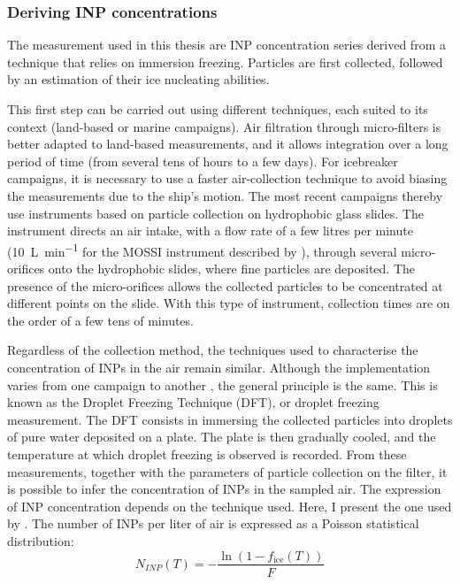        \subsubsection{Deriving INP concentrations}
        The measurement used in this thesis are INP concentration series derived from a technique that relies on immersion freezing. Particles are first collected, followed by an estimation of their ice nucleating abilities.

        This first step can be carried out using different techniques, each suited to its context (land-based or marine campaigns). Air filtration through micro-filters is better adapted to land-based measurements, and it allows integration over a long period of time (from several tens of hours to a few days). For icebreaker campaigns, it is necessary to use a faster air-collection technique to avoid biasing the measurements due to the ship’s motion. The most recent campaigns thereby use instruments based on particle collection on hydrophobic glass slides. The instrument directs an air intake, with a flow rate of a few litres per minute (\SI{10}{\liter\per\minute} for the MOSSI instrument described by \citet{irish_ice_2019}), through several micro-orifices onto the hydrophobic slides, where fine particles are deposited. The presence of the micro-orifices allows the collected particles to be concentrated at different points on the slide. With this type of instrument, collection times are on the order of a few tens of minutes.

    Regardless of the collection method, the techniques used to characterise the concentration of INPs in the air remain similar. Although the implementation varies from one campaign to another \citep{conen_atmospheric_2012, mason_micro-orifice_2015}, the general principle is the same. This is known as the Droplet Freezing Technique (DFT), or droplet freezing measurement. The DFT consists in immersing the collected particles into droplets of pure water deposited on a plate. The plate is then gradually cooled, and the temperature at which droplet freezing is observed is recorded. From these measurements, together with the parameters of particle collection on the filter, it is possible to infer the concentration of INPs in the sampled air.
    The expression of INP concentration depends on the technique used. Here, I present the one used by \citet{wex_annual_2019}. The number of INPs per liter of air is expressed as a Poisson statistical distribution:
    \begin{equation}
        N_{INP}(T) = - \frac{\ln (1-f_{\text{ice}}(T))}{F}
    \end{equation}

